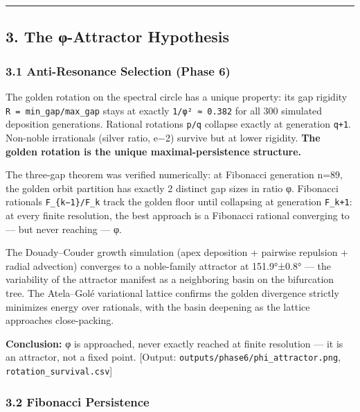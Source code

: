 \documentclass[
]{article}
\begin{document}
\begin{center}\rule{0.5\linewidth}{0.5pt}\end{center}

\subsection{3. The φ-Attractor
Hypothesis}\label{the-ux3c6-attractor-hypothesis}

\subsubsection{3.1 Anti-Resonance Selection (Phase
6)}\label{anti-resonance-selection-phase-6}

The golden rotation on the spectral circle has a unique property: its
gap rigidity \texttt{R\ =\ min\_gap/max\_gap} stays at exactly
\texttt{1/φ²\ ≈\ 0.382} for all 300 simulated deposition generations.
Rational rotations \texttt{p/q} collapse exactly at generation
\texttt{q+1}. Non-noble irrationals (silver ratio, e−2) survive but at
lower rigidity. \textbf{The golden rotation is the unique
maximal-persistence structure.}

The three-gap theorem was verified numerically: at Fibonacci generation
n=89, the golden orbit partition has exactly 2 distinct gap sizes in
ratio φ. Fibonacci rationals \texttt{F\_\{k−1\}/F\_k} track the golden
floor until collapsing at generation \texttt{F\_k+1}: at every finite
resolution, the best approach is a Fibonacci rational converging to ---
but never reaching --- φ.

The Douady--Couder growth simulation (apex deposition + pairwise
repulsion + radial advection) converges to a noble-family attractor at
151.9°±0.8° --- the variability of the attractor manifest as a
neighboring basin on the bifurcation tree. The Atela--Golé variational
lattice confirms the golden divergence strictly minimizes energy over
rationals, with the basin deepening as the lattice approaches
close-packing.

\textbf{Conclusion:} φ is approached, never exactly reached at finite
resolution --- it is an attractor, not a fixed point. {[}Output:
\texttt{outputs/phase6/phi\_attractor.png},
\texttt{rotation\_survival.csv}{]}

\subsubsection{3.2 Fibonacci Persistence}\label{fibonacci-persistence}
\end{document}
